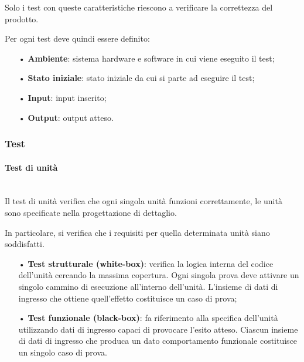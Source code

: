 {Solo i test con queste caratteristiche riescono a verificare la correttezza del prodotto.

Per ogni test deve quindi essere definito: 
\begin{itemize}
\item[•] \textbf{Ambiente}: sistema hardware e software in cui viene eseguito il test; 
\item[•]\textbf{Stato iniziale}: stato iniziale da cui si parte ad eseguire il test; 
\item[•] \textbf{Input}: input inserito;
\item[•] \textbf{Output}: output atteso.
\end{itemize}

\subsubsection{Test}

\paragraph{Test di unità}\mbox{}\\
Il test di unità verifica che ogni singola unità funzioni correttamente, le unità sono specificate nella progettazione di dettaglio.  

In particolare, si verifica che i requisiti per quella determinata unità siano soddisfatti.
\begin{itemize}
\item[•] \textbf{Test strutturale (white-box)}: verifica la logica interna del codice dell’unità cercando la massima copertura. Ogni singola prova deve attivare un singolo cammino di esecuzione all’interno dell’unità. L’insieme di dati di ingresso che ottiene quell’effetto costituisce un caso di prova;
\item[•] \textbf{Test funzionale (black-box)}: fa riferimento alla specifica dell'unità utilizzando dati di ingresso capaci di provocare l'esito atteso. Ciascun insieme di dati di ingresso che produca un dato comportamento funzionale costituisce un singolo caso di prova.
\end{itemize}

}
